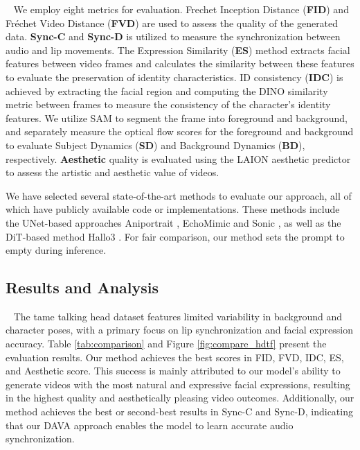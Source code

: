 \documentclass[sigconf]{acmart}
\begin{document}
~ We employ eight metrics for evaluation. Frechet Inception Distance (\textbf{FID}) \cite{heusel2017gans} and Fréchet Video Distance ({\bf{FVD}}) \cite{unterthiner2019fvd} are used to assess the quality of the generated data. 
\textbf{Sync-C}\cite{chung2017out} and \textbf{Sync-D}\cite{chung2017out} is utilized to measure the synchronization between audio and lip movements.  
The Expression Similarity ({\bf{ES}}) method extracts facial features between video frames \cite{deng2019accurate} and calculates the similarity between these features to evaluate the preservation of identity characteristics. ID consistency (\textbf{IDC}) is achieved by extracting the facial region and computing the DINO \cite{caron2021emerging} similarity metric between frames to measure the consistency of the character's identity features. We utilize SAM \cite{kirillov2023segment} to segment the frame into foreground and background, and separately measure the optical flow scores \cite{teed2020raft} for the foreground and background to evaluate Subject Dynamics (\textbf{SD}) and Background Dynamics (\textbf{BD}), respectively. \textbf{Aesthetic} quality is evaluated using the LAION aesthetic predictor \cite{LAIONAIAestheticPredictor} to assess the artistic and aesthetic value of videos. 

We have selected several state-of-the-art methods to evaluate our approach, all of which have publicly available code or implementations. These methods include the UNet-based approaches Aniportrait \cite{wei2024aniportrait}, EchoMimic \cite{chen2024echomimic} and Sonic \cite{ji2024sonic}, as well as the DiT-based method Hallo3 \cite{cui2024hallo3}. For fair comparison, our method sets the prompt to empty during inference.

\subsection{Results and Analysis}

~ The tame talking head dataset features limited variability in background and character poses, with a primary focus on lip synchronization and facial expression accuracy. Table \ref{tab:comparison} and Figure \ref{fig:compare_hdtf} present the evaluation results. Our method achieves the best scores in FID, FVD, IDC, ES, and Aesthetic score. This success is mainly attributed to our model's ability to generate videos with the most natural and expressive facial expressions, resulting in the highest quality and aesthetically pleasing video outcomes. Additionally, our method achieves the best or second-best results in Sync-C and Sync-D, indicating that our DAVA approach enables the model to learn accurate audio synchronization.
\end{document}
